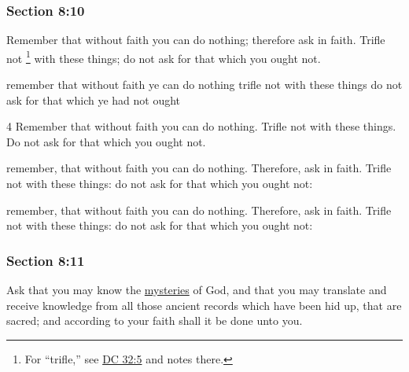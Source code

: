 	\subsubsection{Section 8:10} %
		\label{DC8-10}

		Remember that without faith you can do nothing; therefore ask in faith.  Trifle not%
			\footnote{%
				For ``trifle,'' see \hyperref[DC32-5]{DC 32:5} and notes there.
				}
		with these things; do not ask for that which you ought not.

		\begin{framed}
		\scriptsize
			\begin{compactdesc}
				\item[JSP] remember that without faith ye can do nothing trifle not with these things do not ask for that which ye had not ought
				\item[BC] 4 Remember that without faith you can do nothing. Trifle not with these things. Do not ask for that which you ought not. 
				\item[DC 1835] remember, that without faith you can do nothing. Therefore, ask in faith. Trifle not with these things: do not ask for that which you ought not: 
				\item[DC 1844] remember, that without faith you can do nothing. Therefore, ask in faith. Trifle not with these things: do not ask for that which you ought not: 
			\end{compactdesc}
		\end{framed}

	\subsubsection{Section 8:11} %
		\label{DC8-11}

		Ask that you may know the \hyperref[MYSTERY]{mysteries} of God, and that you may translate and receive knowledge from all those ancient records which have been hid up, that are sacred; and according to your faith shall it be done unto you.


